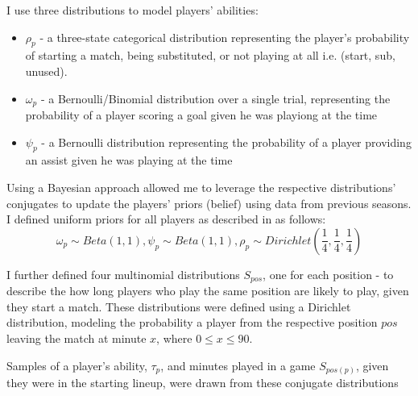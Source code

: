 I use three distributions to model players' abilities:
\begin{itemize}
    \item $\rho_p$ - a three-state categorical distribution representing the player's probability of starting a match, being substituted, or not playing at all i.e. (start, sub, unused).
    \item $\omega_p$ - a Bernoulli/Binomial distribution over a single trial, representing the probability of a player scoring a goal given he was playiong at the time
    \item $\psi_p$ - a Bernoulli distribution representing the probability of a player providing an assist given he was playing at the time
\end{itemize}
Using a Bayesian approach allowed me to leverage the respective distributions' conjugates to update the players' priors (belief) using data from previous seasons. I defined uniform priors for all players as described in \cite{matthews2012} as follows: $$\omega_p \sim Beta(1, 1), \psi_p \sim Beta(1, 1),  \rho_p \sim Dirichlet(\frac{1}{4}, \frac{1}{4}, \frac{1}{4})$$

I further defined four multinomial distributions $S_{pos}$, one for each position - to describe the how long players who play the same position are likely to play, given they start a match. These distributions were defined using a Dirichlet distribution, modeling the probability a player from the respective position $pos$ leaving the match at minute $x$, where $0 \le x \le 90$. 

Samples of a player's ability, $\tau_p$, and minutes played in a game $S_{pos(p)}$, given they were in the starting lineup, were drawn from these conjugate distributions

